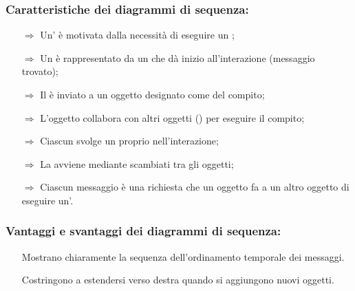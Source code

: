 \subsubsection{Caratteristiche dei diagrammi di sequenza:}

\begin{itemize}
    \item [$\Rightarrow$] Un' è motivata dalla necessità
    di eseguire un ;
    \item [$\Rightarrow$] Un  è rappresentato da un 
     che dà inizio all'interazione (messaggio trovato);
    \item [$\Rightarrow$] Il  è inviato a un oggetto designato
    come  del compito;
    \item [$\Rightarrow$] L'oggetto  collabora con
    altri oggetti () per eseguire il compito;
    \item [$\Rightarrow$] Ciascun  svolge un proprio
     nell'interazione;
    \item [$\Rightarrow$] La  avviene mediante 
     scambiati tra gli oggetti;
    \item [$\Rightarrow$] Ciascun messaggio è una richiesta che un oggetto fa a un altro
    oggetto di eseguire un'.
\end{itemize}

\subsubsection{Vantaggi e svantaggi dei diagrammi di sequenza:}

\begin{itemize}
    \item [\textcolor{green}{\checkmark}] Mostrano chiaramente la sequenza 
    dell'ordinamento temporale dei messaggi.
    \item [\textcolor{red}{\XSolidBrush}] Costringono a estendersi verso destra
    quando si aggiungono nuovi oggetti.
\end{itemize}


